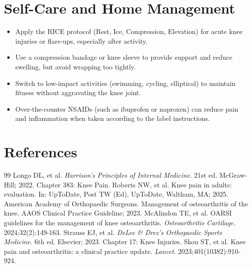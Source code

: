 \section*{Self-Care and Home Management}
\begin{itemize}
  \item Apply the RICE protocol (Rest, Ice, Compression, Elevation) for acute knee injuries or flare-ups, especially after activity.
  \item Use a compression bandage or knee sleeve to provide support and reduce swelling, but avoid wrapping too tightly.
  \item Switch to low-impact activities (swimming, cycling, elliptical) to maintain fitness without aggravating the knee joint.
  \item Over-the-counter NSAIDs (such as ibuprofen or naproxen) can reduce pain and inflammation when taken according to the label instructions.
\end{itemize}

\section*{References}

\begin{thebibliography}{99}
 Longo DL, et al. \emph{Harrison's Principles of Internal Medicine}. 21st ed. McGraw-Hill; 2022. Chapter 383: Knee Pain.
 Roberts NW, et al. Knee pain in adults: evaluation. In: UpToDate, Post TW (Ed), UpToDate, Waltham, MA; 2025.
 American Academy of Orthopaedic Surgeons. Management of osteoarthritis of the knee. AAOS Clinical Practice Guideline; 2023.
 McAlindon TE, et al. OARSI guidelines for the management of knee osteoarthritis. \emph{Osteoarthritis Cartilage}. 2024;32(2):149-163.
 Strauss EJ, et al. \emph{DeLee \& Drez's Orthopaedic Sports Medicine}. 6th ed. Elsevier; 2023. Chapter 17: Knee Injuries.
 Skou ST, et al. Knee pain and osteoarthritis: a clinical practice update. \emph{Lancet}. 2023;401(10382):910-924.
\end{thebibliography}
